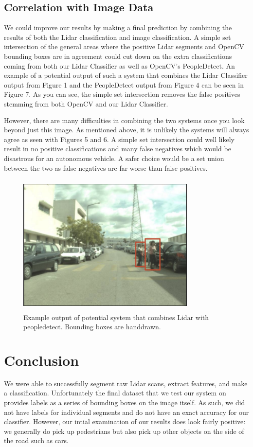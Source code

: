 \documentclass[10pt,twocolumn,letterpaper]{article}
\begin{document}
  \subsection{Correlation with Image Data}
  We could improve our results by making a final prediction by combining
  the results of both the Lidar classification and image classification. A simple
  set intersection of the general areas where the positive Lidar segments and OpenCV
  bounding boxes are in agreement could cut down on the extra classifications coming from
  both our Lidar Classifier as well as OpenCV's PeopleDetect. An example of a potential
  output of such a system that combines the Lidar Classifier output from Figure 1
  and the PeopleDetect output from Figure 4 can be seen in Figure 7. As you can see,
  the simple set intersection removes the false positives stemming from both OpenCV and
  our Lidar Classifier.

  However, there are many difficulties in combining the two systems once you look
  beyond just this image. As mentioned above, it is unlikely the systems will always
  agree as seen with Figures 5 and 6. A simple set intersection could well likely result
  in no positive classifications and many false negatives which would be disastrous
  for an autonomous vehicle. A safer choice would be a set union between the two as
  false negatives are far worse than false positives.

  \begin{figure}
    \includegraphics[height=2.8in, width=3.5in]{images/futureWork.png}
    \caption{ Example output of potential system that combines Lidar with peopledetect.
    Bounding boxes are handdrawn. }
  \end{figure}

\section{Conclusion}
  We were able to successfully segment raw Lidar scans, extract
  features, and make a classification. Unfortunately the final dataset that
  we test our system on provides labels as a series of bounding boxes on the
  image itself. As such, we did not have labels for individual segments and do
  not have an exact accuracy for our classifier. However, our intial examination
  of our results does look fairly positive: we generally do pick up pedestrians
  but also pick up other objects on the side of the road such as cars.
\end{document}
